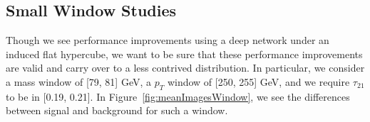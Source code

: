 


\subsection{Small Window Studies} %
\label{sub:small_window_studies}

Though we see performance improvements using a deep network under an induced flat hypercube, we want to be sure that these performance improvements are valid and carry over to a less contrived distribution. In particular, we consider a mass window of [79, 81] GeV, a $p_T$ window of [250, 255] GeV, and we require $\tau_21$ to be in [0.19, 0.21]. In Figure~\ref{fig:meanImagesWindow}, we see the differences between signal and background for such a window.

